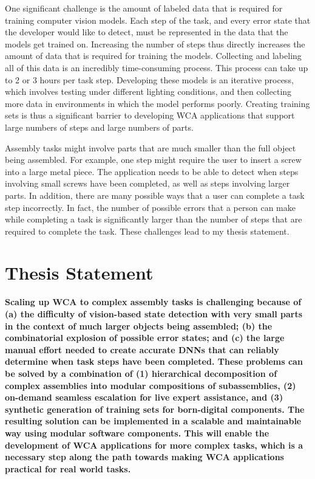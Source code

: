 One significant challenge is the amount of labeled data that is required for
training computer vision models. Each
step of the task, and every error state that the developer would like to detect,
must be represented in the data that the models get trained on.
Increasing the number of steps thus directly increases the amount of data that
is required for training the models.
Collecting and labeling all of this data is an incredibly time-consuming
process.
This process can take up to 2 or 3 hours per task step.
Developing these models is an iterative process, which involves testing under
different lighting conditions, and then collecting more data in environments
in which the model performs poorly.
Creating training sets is thus a significant barrier to developing WCA
applications that support large numbers of steps and large numbers of parts.

Assembly tasks might involve parts that are much smaller than the full object
being assembled.
For example, one step might require the user to insert a screw into a large
metal piece.
The application needs to be able to detect when steps involving small screws
have been completed, as well as steps involving larger parts.
In addition, there are many possible ways that a user can complete a task step
incorrectly.
In fact, the number of possible errors that a person can make while completing a
task is significantly larger than the number of steps that are required to
complete the task.
These challenges lead to my thesis statement.

\section{Thesis Statement}

\textbf{
  Scaling up WCA to complex assembly tasks is challenging because of
  (a) the difficulty of
  vision-based state detection with very small parts in the context of much
  larger objects being assembled; (b) the combinatorial explosion
  of possible error states; and (c) the large manual effort needed to create
  accurate DNNs that can reliably determine when task steps have been completed.
  These problems can be solved by a combination of (1) hierarchical
  decomposition of
  complex assemblies into modular compositions of subassemblies, (2) on-demand
  seamless
  escalation for live expert assistance, and (3) synthetic generation of
  training
  sets for born-digital components. The resulting solution can be implemented in
  a scalable and maintainable way using modular software components.
  This will enable the development of WCA applications for more complex tasks,
  which is a necessary step along the path towards making WCA applications
  practical for real world tasks.
}

